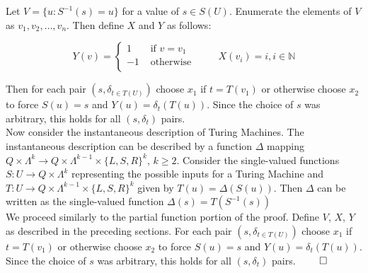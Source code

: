 \documentclass[11pt]{article}
\newcommand{\N}{\mathbb{N}}
\let\emptyset\varnothing
\begin{document}

Let $ V = \{u : S^{-1}(s) = u \} $ for a value of $ s \in S(U) $. Enumerate the elements of $V$ as $v_1, v_2, \dots , v_n$. Then define $ X $ and $ Y $ as follows:

\begin{equation*}
Y(v) = \begin{cases}
       1 & \text{ if } v = v_1 \\
       -1 & \text{ otherwise } \\
       \end{cases} \quad \quad
X(v_i) = i, i \in \N
\end{equation*}

\bigskip
Then for each pair $ (s, \delta_{t \in T(U)} ) $ choose $ x_1 $ if $ t = T(v_1) $ or otherwise choose $ x_2 $ to force $ S(u) = s $ and $ Y(u) = \delta_{t}(T(u)) $. Since the choice of $ s $ was arbitrary, this holds for all $ (s, \delta_t) $ pairs. \\


Now consider the instantaneous description of Turing Machines. The instantaneous description can be described by a function $ \Delta $ mapping $ Q \times \Lambda^{k} \rightarrow Q \times \Lambda^{k - 1} \times \{ L, S, R \} ^{k} $, $ k \geq 2 $. Consider the single-valued functions $ S: U \rightarrow Q \times \Lambda^{k} $ representing the possible inputs for a Turing Machine and $ T: U \rightarrow Q \times \Lambda^{k - 1} \times \{ L, S, R \}^ {k} $ given by $ T(u) = \Delta(S(u)) $. Then $ \Delta $ can be written as the single-valued function $ \Delta(s) = T(S^{-1}(s)) $ \\

We proceed similarly to the partial function portion of the proof. Define $ V $, $ X $, $ Y $ as described in the preceding sections. For each pair $ (s, \delta_{t \in T(U)} ) $ choose $ x_1 $ if $ t = T(v_1) $ or otherwise choose $ x_2 $ to force $ S(u) = s $ and $ Y(u) = \delta_{t}(T(u)) $. Since the choice of $ s $ was arbitrary, this holds for all $ (s, \delta_t) $ pairs. $ \hfill \qed $ \\

\end{document}

